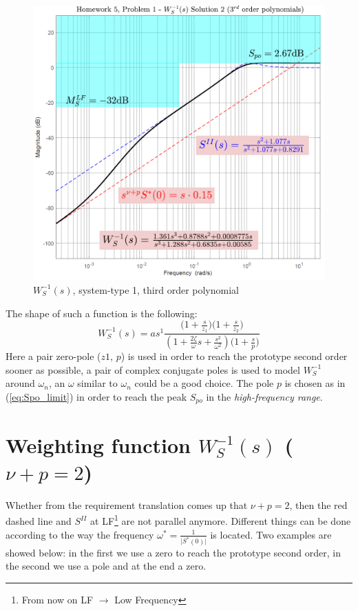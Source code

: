 \documentclass[a4paper, 12pt]{article}
\begin{document}
    \begin{figure}\label{fig:type1_3rd}
        \centering
        \includegraphics[scale=0.7]{img/Ws_type1_third.png}
        \caption{$W_S^{-1}(s)$, system-type 1, third order polynomial}
    \end{figure}
    The shape of such a function is the following:
    {\large{
        \begin{equation}
            W_S^{-1}(s) = a{s^{1}} \frac{
                \bigl(1+\frac{s}{z_1}\bigr)
                \bigl(1+\frac{s}{z_2}\bigr)
            }
            {
                {(1+\frac{2\zeta}{\omega}s+\frac{s^2}{\omega^2})}
                {\bigl(1+\frac{s}{p}\bigr)}
            }
        \end{equation}
    }}
    Here a pair zero-pole ($z1$, $p$) is used in order to reach the prototype second order sooner as possible, a pair of complex conjugate poles is used to model $W_S^{-1}$ around $\omega_n$, an $\omega$ similar to $\omega_n$ could be a good choice. The pole $p$ is chosen as in (\ref{eq:Spo_limit}) in order to reach the peak $S_{po}$ in the \textit{high-frequency range}. 

    \section{Weighting function $W_S^{-1}(s)$ ($\nu+p=2$)}
    Whether from the requirement translation comes up that $\nu+p=2$, then the red dashed line and $S^{II}$ at LF\footnote{
        From now on LF $\to$ Low Frequency
    } are not parallel anymore. Different things can be done according to the way the frequency $\omega^{*}=\frac{1}{\vert S^{*}(0) \vert}$ is located. Two examples are showed below: in the first we use a zero to reach the prototype second order, in the second we use a pole and at the end a zero.
\end{document}
